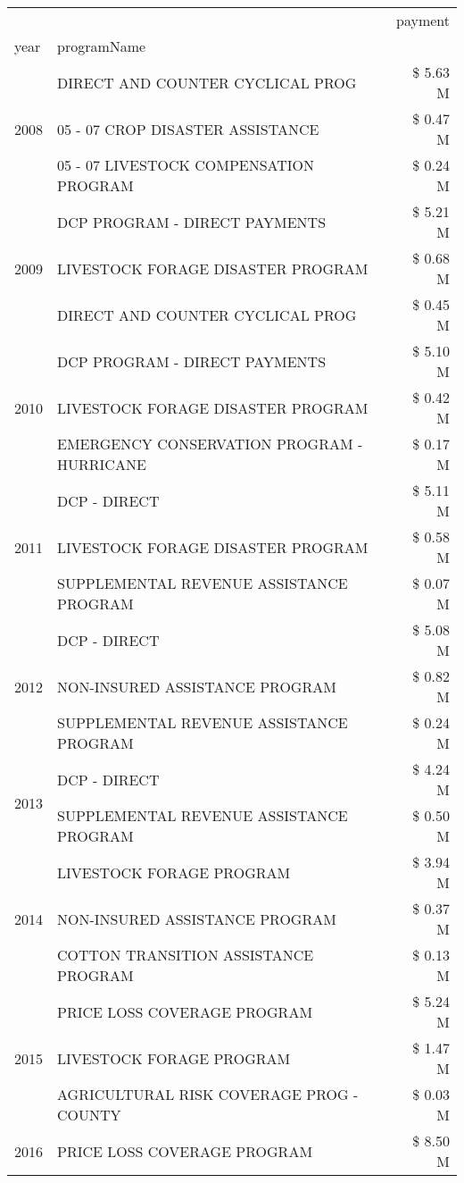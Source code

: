 \begin{tabular}{llr}
\toprule
 &  & payment \\
year & programName &  \\
\midrule
\multirow[t]{3}{*}{2008} & DIRECT AND COUNTER CYCLICAL PROG & \$ 5.63 M \\
 & 05 - 07 CROP DISASTER ASSISTANCE & \$ 0.47 M \\
 & 05 - 07 LIVESTOCK COMPENSATION PROGRAM & \$ 0.24 M \\
\cline{1-3}
\multirow[t]{3}{*}{2009} & DCP PROGRAM - DIRECT PAYMENTS & \$ 5.21 M \\
 & LIVESTOCK FORAGE DISASTER  PROGRAM & \$ 0.68 M \\
 & DIRECT AND COUNTER CYCLICAL PROG & \$ 0.45 M \\
\cline{1-3}
\multirow[t]{3}{*}{2010} & DCP PROGRAM - DIRECT PAYMENTS & \$ 5.10 M \\
 & LIVESTOCK FORAGE DISASTER  PROGRAM & \$ 0.42 M \\
 & EMERGENCY CONSERVATION PROGRAM - HURRICANE & \$ 0.17 M \\
\cline{1-3}
\multirow[t]{3}{*}{2011} & DCP - DIRECT & \$ 5.11 M \\
 & LIVESTOCK FORAGE DISASTER PROGRAM & \$ 0.58 M \\
 & SUPPLEMENTAL REVENUE ASSISTANCE PROGRAM & \$ 0.07 M \\
\cline{1-3}
\multirow[t]{3}{*}{2012} & DCP - DIRECT & \$ 5.08 M \\
 & NON-INSURED ASSISTANCE PROGRAM & \$ 0.82 M \\
 & SUPPLEMENTAL REVENUE ASSISTANCE PROGRAM & \$ 0.24 M \\
\cline{1-3}
\multirow[t]{2}{*}{2013} & DCP - DIRECT & \$ 4.24 M \\
 & SUPPLEMENTAL REVENUE ASSISTANCE PROGRAM & \$ 0.50 M \\
\cline{1-3}
\multirow[t]{3}{*}{2014} & LIVESTOCK FORAGE PROGRAM & \$ 3.94 M \\
 & NON-INSURED ASSISTANCE PROGRAM & \$ 0.37 M \\
 & COTTON TRANSITION ASSISTANCE PROGRAM & \$ 0.13 M \\
\cline{1-3}
\multirow[t]{3}{*}{2015} & PRICE LOSS COVERAGE PROGRAM & \$ 5.24 M \\
 & LIVESTOCK FORAGE PROGRAM & \$ 1.47 M \\
 & AGRICULTURAL RISK COVERAGE PROG - COUNTY & \$ 0.03 M \\
\cline{1-3}
\multirow[t]{3}{*}{2016} & PRICE LOSS COVERAGE PROGRAM & \$ 8.50 M \\

\end{tabular}
